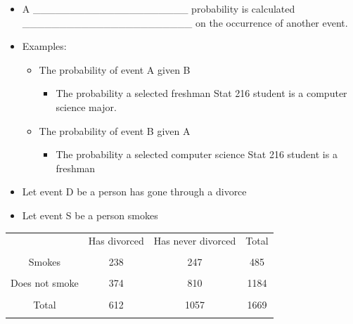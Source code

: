 \documentclass[
]{report}
\providecommand{\tightlist}{%
  \setlength{\itemsep}{0pt}\setlength{\parskip}{0pt}}
\begin{document}
\begin{itemize}
  \begin{itemize}
  \item
    A \_\_\_\_\_\_\_\_\_\_\_\_\_\_\_\_\_\_\_\_\_ probability is calculated
    \_\_\_\_\_\_\_\_\_\_\_\_\_\_\_\_\_\_\_\_\_\_\_ on the occurrence of another event.
  \item
    Examples:

    \begin{itemize}
    \item
      The probability of event A given B

      \begin{itemize}
      \tightlist
      \item
        The probability a selected freshman Stat 216 student is a computer science major.
      \end{itemize}
    \item
      The probability of event B given A

      \begin{itemize}
      \tightlist
      \item
        The probability a selected computer science Stat 216 student is a freshman
      \end{itemize}
    \end{itemize}
  \end{itemize}
\end{itemize}


\begin{itemize}
\item
  Let event D be a person has gone through a divorce
\item
  Let event S be a person smokes
\end{itemize}

\begin{center}
\begin{tabular}{|c|c|c|c|} \hline
\hspace{0.8in} & \hspace{0.35in} Has divorced \hspace{.35in} & \hspace{0.35in} Has never divorced  \hspace{0.35in} & \hspace{0.3in} Total \hspace{0.3in} \\ 
& & & \\ \hline
Smokes & 238 & 247 & 485 \\ 
& & & \\ \hline
Does not smoke & 374 & 810 & 1184 \\ 
& & & \\ \hline
Total & 612 & 1057 & 1669 \\ 
& & & \\ \hline
\end{tabular}
\end{center}
\vspace{.1in}
\end{document}
